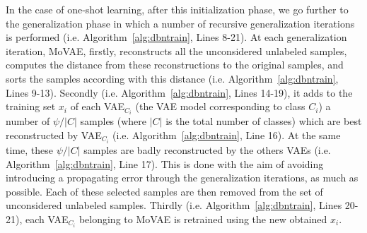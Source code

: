 \documentclass[sigconf,authorversion=true]{aamas}  %
\begin{document}
In the case of one-shot learning, after this initialization phase, we go further to the generalization phase in which a number of recursive generalization iterations is performed (i.e. Algorithm~\ref{alg:dbntrain}, Lines 8-21). At each generalization iteration, MoVAE, firstly, reconstructs all the unconsidered unlabeled samples, computes the distance from these reconstructions to the original samples, and sorts the samples according with this distance (i.e. Algorithm~\ref{alg:dbntrain}, Lines 9-13). Secondly (i.e. Algorithm~\ref{alg:dbntrain}, Lines 14-19), it adds to the training set $x_i$ of each VAE$_{C_i}$ (the VAE model corresponding to class $C_i$) a number of $\psi/|C|$ samples (where $|C|$ is the total number of classes) which are best reconstructed by VAE$_{C_i}$ (i.e. Algorithm~\ref{alg:dbntrain}, Line 16). At the same time, these $\psi/|C|$ samples are badly reconstructed by the others VAEs (i.e. Algorithm~\ref{alg:dbntrain}, Line 17). This is done with the aim of avoiding introducing a propagating error through the generalization iterations, as much as possible. Each of these selected samples are then removed from the set of unconsidered unlabeled samples. Thirdly (i.e. Algorithm~\ref{alg:dbntrain}, Lines 20-21), each VAE$_{C_i}$ belonging to MoVAE is retrained using the new obtained $x_i$.
\end{document}
